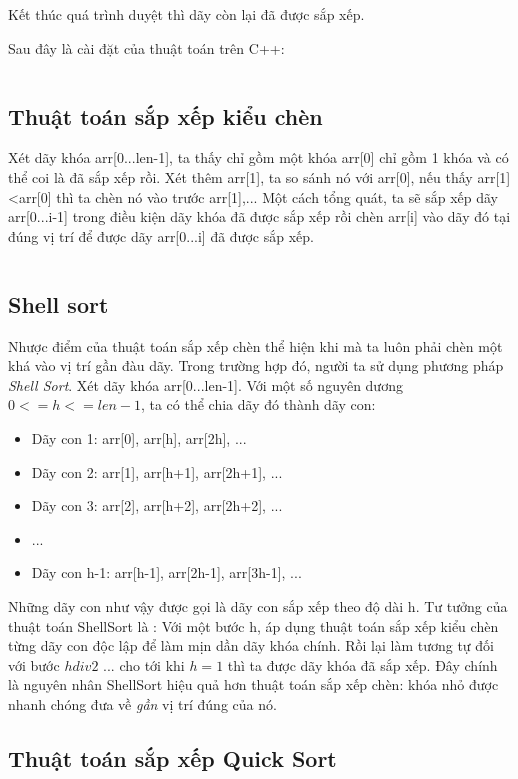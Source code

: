 \documentclass[a4paper]{article}
\newcommand{\mnt}[1]{\inputminted[frame=single, linenos=true, tabsize=4]{c++}{#1}}
\begin{document}
Kết thúc quá trình duyệt thì dãy còn lại đã được sắp xếp.

Sau đây là cài đặt của thuật toán trên C++:
\mnt{src/selectionsort.cpp}

\subsection{Thuật toán sắp xếp kiểu chèn}

Xét dãy khóa arr[0...len-1], ta thấy chỉ gồm một khóa arr[0] chỉ gồm 1 khóa và có thể coi là đã sắp xếp rồi. Xét thêm arr[1], ta so sánh nó với arr[0], nếu thấy arr[1]<arr[0] thì ta chèn nó vào trước arr[1],... Một cách tổng quát, ta sẽ sắp xếp dãy arr[0...i-1] trong điều kiện dãy khóa đã được sắp xếp rồi chèn arr[i] vào dãy đó tại đúng vị trí để được dãy arr[0...i] đã được sắp xếp.

\mnt{src/insertionsort.cpp}

\subsection{Shell sort}

Nhược điểm của thuật toán sắp xếp chèn thể hiện khi mà ta luôn phải chèn một khá vào vị trí gần đàu dãy. Trong trường hợp đó, người ta sử dụng phương pháp \emph{Shell Sort}. Xét dãy khóa arr[0...len-1]. Với một số nguyên dương $0 <= h <= len-1$, ta có thể chia dãy đó thành dãy con:
\begin{itemize}
\item Dãy con 1: arr[0], arr[h], arr[2h], ...
\item Dãy con 2: arr[1], arr[h+1], arr[2h+1], ...
\item Dãy con 3: arr[2], arr[h+2], arr[2h+2], ...
\item ...
\item Dãy con h-1: arr[h-1], arr[2h-1], arr[3h-1], ...
\end{itemize}

Những dãy con như vậy được gọi là dãy con sắp xếp theo độ dài h. Tư tưởng của thuật toán ShellSort là : Với một bước h, áp dụng thuật toán sắp xếp kiểu chèn từng dãy con độc lập để làm mịn dần dãy khóa chính. Rồi lại làm tương tự đối với bước $h div 2$ ... cho tới khi $h=1$ thì ta được dãy khóa đã sắp xếp.
Đây chính là nguyên nhân ShellSort hiệu quả hơn thuật toán sắp xếp chèn: khóa nhỏ được nhanh chóng đưa về \emph{gần} vị trí đúng của nó.

\subsection{Thuật toán sắp xếp Quick Sort}
\end{document}
